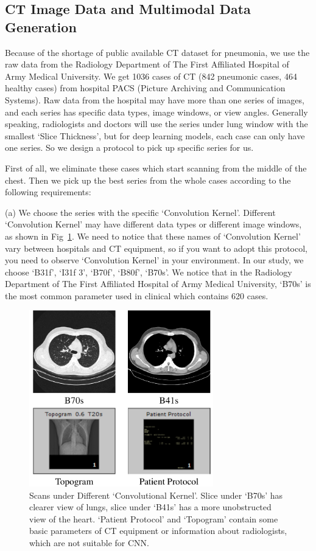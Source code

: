 \documentclass[journal]{IEEEtran}
\begin{document}
\subsection{CT Image Data and Multimodal Data Generation}
\label{ctimagedata}
Because of the shortage of public available CT dataset for pneumonia, we use the raw data from the Radiology Department of The First Affiliated Hospital of Army Medical University. We get 1036 cases of CT (842 pneumonic cases, 464 healthy cases) from hospital PACS (Picture Archiving and Communication Systems). Raw data from the hospital may have more than one series of images, and each series has specific data types, image windows, or view angles. 
Generally speaking, radiologists and doctors will use the series under lung window with the smallest `Slice Thickness', but for deep learning models, each case can only have one series. So we design a protocol to pick up specific series for us.

First of all, we eliminate these cases which start scanning from the middle of the chest. Then we pick up the best series from the whole cases according to the following requirements:

(a) We choose the series with the specific `Convolution Kernel'. Different `Convolution Kernel' may have different data types or different image windows, as shown in Fig~\ref{Bs}. We need to notice that these names of `Convolution Kernel' vary between hospitals and CT equipment, so if you want to adopt this protocol, you need to observe `Convolution Kernel' in your environment. In our study, we choose `B31f', `I31f 3', `B70f', `B80f', `B70s'. We notice that in the Radiology Department of The First Affiliated Hospital of Army Medical University, `B70s' is the most common parameter used in clinical which contains 620 cases.

\begin{figure}[t]
    \centerline{\includegraphics[width=80mm]{Bs.pdf}}
    \vspace{-0cm}
    \caption{Scans under Different `Convolutional Kernel'. Slice under `B70s' has clearer view of lungs, slice under `B41s' has a more unobstructed view of the heart. `Patient Protocol' and `Topogram' contain some basic parameters of CT equipment or information about radiologists, which are not suitable for CNN.}
    \vspace{-0cm}
    \label{Bs}
    \end{figure}
\end{document}
